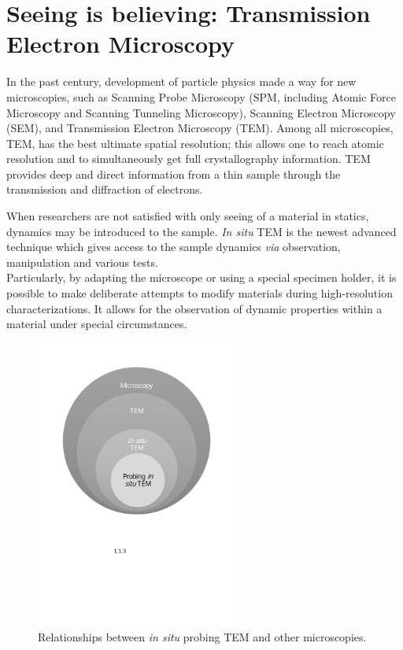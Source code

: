 \section{Seeing is believing: Transmission Electron Microscopy}
In the past century, development of particle physics made a way for new microscopies, such as Scanning Probe Microscopy (SPM, including Atomic Force Microscopy and Scanning Tunneling Microscopy), Scanning Electron Microscopy (SEM), and Transmission Electron Microscopy (TEM). Among all microscopies, TEM, has the best ultimate spatial resolution; this allows one to reach atomic resolution and to simultaneously get full crystallography information. TEM provides deep and direct information from a thin sample through the transmission and diffraction of electrons. 

When researchers are not satisfied with only seeing of a material in statics, dynamics may be introduced to the sample. \emph{In situ} TEM is the newest advanced technique which gives access to the sample dynamics \textit{via} observation, manipulation and various tests.\\
Particularly, by adapting the microscope or using a special specimen holder, it is possible to make deliberate attempts to modify materials during high-resolution characterizations. It allows for the observation of dynamic properties within a material under special circumstances.\cite{banhart2008situ}\\

\begin{figure}  
\centering
\includegraphics[width=0.6\textwidth]{figures/figure1_TEM_As_Microscopy.pdf}
\caption[\emph{In situ} TEM as a microscopy branch]{Relationships between \textit{in situ} probing TEM and other microscopies.
\label{fig:1tam}}
\end{figure}

